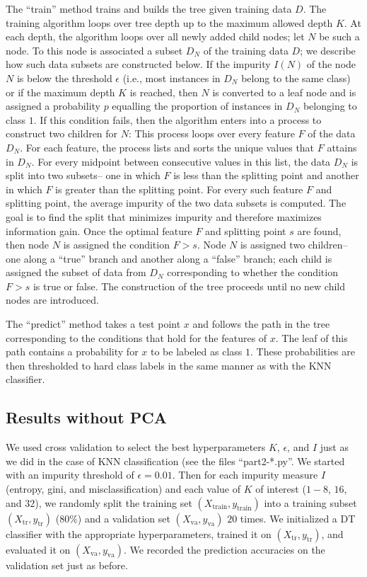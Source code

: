 \documentclass[12pt]{article}
\newcommand{\eps}{\epsilon}
\newcommand{\Xtrain}{X_{\mbox{train}}}
\newcommand{\ytrain}{y_{\mbox{train}}}
\newcommand{\Xtr}{X_{\mbox{tr}}}
\newcommand{\ytr}{y_{\mbox{tr}}}
\newcommand{\Xva}{X_{\mbox{va}}}
\newcommand{\yva}{y_{\mbox{va}}}
\begin{document}
The ``train''  method trains and builds the tree given training data $D$. The training algorithm loops over tree depth up to the maximum allowed depth $K$. At each depth, the algorithm loops over all newly added child nodes; let $N$ be such a node. To this node is associated a subset $D_N$ of the training data $D$; we describe how such data subsets are constructed below. If the impurity $I(N)$ of the node $N$ is below the threshold $\eps$ (i.e., most instances in $D_N$ belong to the same class) or if the maximum depth $K$ is reached, then $N$ is converted to a leaf node and is assigned a probability $p$ equalling the proportion of instances in $D_N$ belonging to class $1$. If this condition fails, then the algorithm enters into a process to construct two children for $N$: This process loops over every feature $F$ of the data $D_N$. For each feature, the process lists and sorts the unique values that $F$ attains in $D_N$. For every midpoint between consecutive values in this list, the data $D_N$ is split into two subsets-- one in which $F$ is less than the splitting point and another in which $F$ is greater than the splitting point. For every such feature $F$ and splitting point, the average impurity of the two data subsets is computed. The goal is to find the split that minimizes impurity and therefore maximizes information gain. Once the optimal feature $F$ and splitting point $s$ are found, then node $N$ is assigned the condition $F > s$. Node $N$ is assigned two children-- one along a ``true'' branch and another along a ``false'' branch; each child is assigned the subset of data from $D_N$ corresponding to whether the condition $F > s$ is true or false. The construction of the tree proceeds until no new child nodes are introduced.

The ``predict'' method takes a test point $x$ and follows the path in the tree corresponding to the conditions that hold for the features of $x$. The leaf of this path contains a probability for $x$ to be labeled as class $1$. These probabilities are then thresholded to hard class labels in the same manner as with the KNN classifier.

\subsection{Results without PCA}

We used cross validation to select the best hyperparameters $K$, $\eps$, and $I$ just as we did in the case of KNN classification (see the files ``part2-*.py''. We started with an impurity threshold of $\eps=0.01$. Then for each impurity measure $I$ (entropy, gini, and misclassification) and each value of $K$ of interest ($1-8$, $16$, and $32$), we randomly split the training set $(\Xtrain, \ytrain)$ into a training subset $(\Xtr, \ytr)$ ($80\%$) and a validation set $(\Xva, \yva)$ $20$ times. We initialized a DT classifier with the appropriate hyperparameters, trained it on $(\Xtr, \ytr)$, and evaluated it on $(\Xva, \yva)$. We recorded the prediction accuracies on the validation set just as before.
\end{document}
